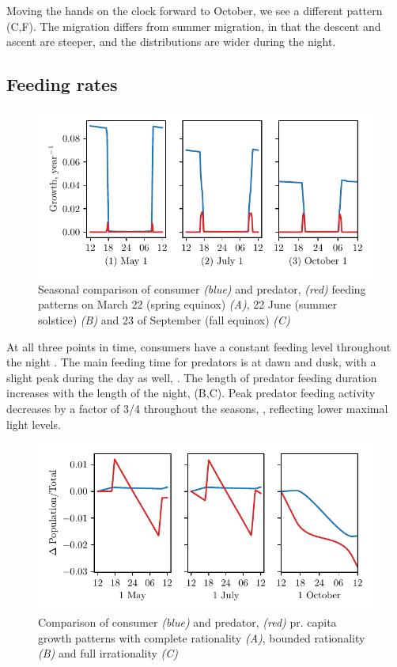 Moving the hands on the clock forward to October, we see a different pattern (C,F). The migration differs from summer migration, in that the descent and ascent are steeper, and the distributions are wider during the night.

\subsection*{Feeding rates}
\begin{figure}[H]
\includegraphics{plots/growth_short_rational.pdf}
\caption{Seasonal comparison of consumer \emph{(blue)} and predator, \emph{(red)} feeding patterns on March 22 (spring equinox) \emph{(A)}, 22 June (summer solstice) \emph{(B)} and 23 of September (fall equinox) \emph{(C)}}
\label{fig:growth_short_rational}
\end{figure}
At all three points in time, consumers have a constant feeding level throughout the night . The main feeding time for predators is at dawn and dusk, with a slight peak during the day as well, . The length of predator feeding duration increases with the length of the night,  (B,C). Peak predator feeding activity decreases by a factor of 3/4 throughout the seasons, , reflecting lower maximal light levels.
\begin{figure}[H]
  \begin{centering}
\includegraphics{plots/pop_dyn_comp_full_semi_none.pdf}
\end{centering}
\caption{Comparison of consumer \emph{(blue)} and predator, \emph{(red)} pr. capita growth patterns with complete rationality \emph{(A)}, bounded rationality \emph{(B)} and full irrationality \emph{(C)}}
\label{fig:pop_short_term}
\end{figure}
